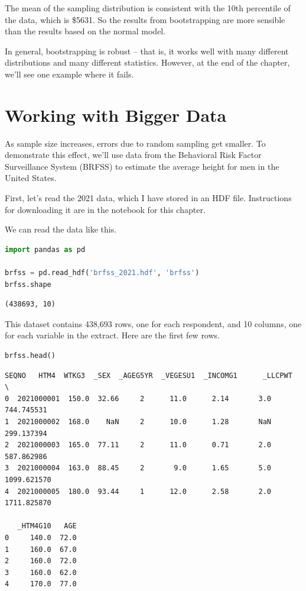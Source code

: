 The mean of the sampling distribution is consistent with the 10th
percentile of the data, which is \$5631. So the results from
bootstrapping are more sensible than the results based on the normal
model.

In general, bootstrapping is robust -- that is, it works well with many
different distributions and many different statistics. However, at the
end of the chapter, we'll see one example where it fails.

\hypertarget{working-with-bigger-data}{%
\section{Working with Bigger Data}\label{working-with-bigger-data}}

As sample size increases, errors due to random sampling get smaller. To
demonstrate this effect, we'll use data from the Behavioral Risk Factor
Surveillance System (BRFSS) to estimate the average height for men in
the United States.

First, let's read the 2021 data, which I have stored in an HDF file.
Instructions for downloading it are in the notebook for this chapter.

We can read the data like this.

\begin{lstlisting}[language=Python,style=source]
import pandas as pd

brfss = pd.read_hdf('brfss_2021.hdf', 'brfss')
brfss.shape
\end{lstlisting}

\begin{lstlisting}[style=output]
(438693, 10)
\end{lstlisting}

This dataset contains 438,693 rows, one for each respondent, and 10
columns, one for each variable in the extract. Here are the first few
rows.

\begin{lstlisting}[language=Python,style=source]
brfss.head()
\end{lstlisting}

\begin{lstlisting}[style=output]
        SEQNO   HTM4  WTKG3  _SEX  _AGEG5YR  _VEGESU1  _INCOMG1      _LLCPWT  \
0  2021000001  150.0  32.66     2      11.0      2.14       3.0   744.745531   
1  2021000002  168.0    NaN     2      10.0      1.28       NaN   299.137394   
2  2021000003  165.0  77.11     2      11.0      0.71       2.0   587.862986   
3  2021000004  163.0  88.45     2       9.0      1.65       5.0  1099.621570   
4  2021000005  180.0  93.44     1      12.0      2.58       2.0  1711.825870   

   _HTM4G10   AGE  
0     140.0  72.0  
1     160.0  67.0  
2     160.0  72.0  
3     160.0  62.0  
4     170.0  77.0  
\end{lstlisting}

